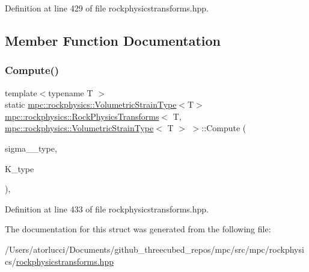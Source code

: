 Definition at line 429 of file rockphysicstransforms.\+hpp.



\subsection{Member Function Documentation}
\mbox{\label{structmpc_1_1rockphysics_1_1_rock_physics_transforms_3_01_t_00_01mpc_1_1rockphysics_1_1_volumetric_strain_type_3_01_t_01_4_01_4_aab8c94dcc7523c64c2985dacf02bd160}} 
\subsubsection{\texorpdfstring{Compute()}{Compute()}}
{\footnotesize\ttfamily template$<$typename T $>$ \\
static \mbox{\hyperlink{structmpc_1_1rockphysics_1_1_volumetric_strain_type}{mpc\+::rockphysics\+::\+Volumetric\+Strain\+Type}}$<$T$>$ \mbox{\hyperlink{structmpc_1_1rockphysics_1_1_rock_physics_transforms}{mpc\+::rockphysics\+::\+Rock\+Physics\+Transforms}}$<$ T, \mbox{\hyperlink{structmpc_1_1rockphysics_1_1_volumetric_strain_type}{mpc\+::rockphysics\+::\+Volumetric\+Strain\+Type}}$<$ T $>$ $>$\+::Compute (\begin{DoxyParamCaption}\item[{const \mbox{\hyperlink{structmpc_1_1rockphysics_1_1_hydrostatic_pressure_type}{mpc\+::rockphysics\+::\+Hydrostatic\+Pressure\+Type}}$<$ T $>$ \&}]{sigma\+\_\+\_\+type,  }\item[{const \mbox{\hyperlink{structmpc_1_1rockphysics_1_1_bulk_modulus_type}{mpc\+::rockphysics\+::\+Bulk\+Modulus\+Type}}$<$ T $>$ \&}]{K\+\_\+type }\end{DoxyParamCaption})\hspace{0.3cm}{\ttfamily [inline]}, {\ttfamily [static]}}



Definition at line 433 of file rockphysicstransforms.\+hpp.



The documentation for this struct was generated from the following file\+:\begin{DoxyCompactItemize}
\item 
/\+Users/atorlucci/\+Documents/github\+\_\+threecubed\+\_\+repos/mpc/src/mpc/rockphysics/\mbox{\hyperlink{rockphysicstransforms_8hpp}{rockphysicstransforms.\+hpp}}\end{DoxyCompactItemize}
